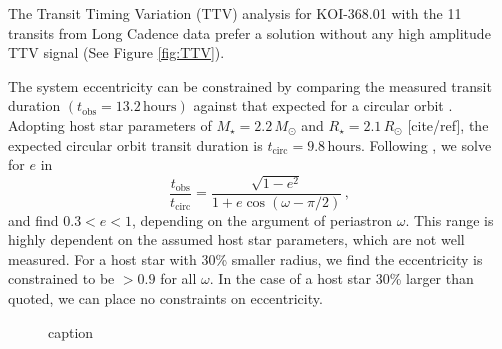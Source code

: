 \documentclass[preprint]{emulateapj}
\begin{document}
The Transit Timing Variation (TTV) analysis for KOI-368.01 with the 
11 transits from Long Cadence data prefer a solution without any high 
amplitude TTV signal (See Figure \ref{fig:TTV}).

The system eccentricity can be constrained by comparing the measured
transit duration $(t_\text{obs}=13.2\,\text{hours})$ against that expected for a circular
orbit \citep[e.g.][]{Barnes2007,Burke2008,Kane2012}. Adopting host star
parameters of $M_\star = 2.2\,M_\odot$ and $R_\star = 2.1\,R_\odot$
[cite/ref], the expected circular orbit transit duration is
$t_\text{circ} =9.8\,\text{hours}$. Following \citet{Burke2008}, we
solve for $e$ in
\begin{equation}
  \label{eq:ecc}
  \frac{t_\text{obs}}{t_\text{circ}} = \frac{\sqrt{1-e^2}}{1+e \cos(\omega-\pi/2)}\,,
\end{equation}
and find $0.3 < e < 1$, depending on the argument of periastron $\omega$. This range is highly
dependent on the assumed host star parameters, which are not well
measured. For a host star with 30\% smaller radius, we find the
eccentricity is constrained to be $>0.9$ for all $\omega$. In the case
of a host star 30\% larger than quoted, we can place no constraints on
eccentricity. 

\begin{figure}
\caption{
caption
\label{fig:FPs}
}
\end{figure}
\end{document}
